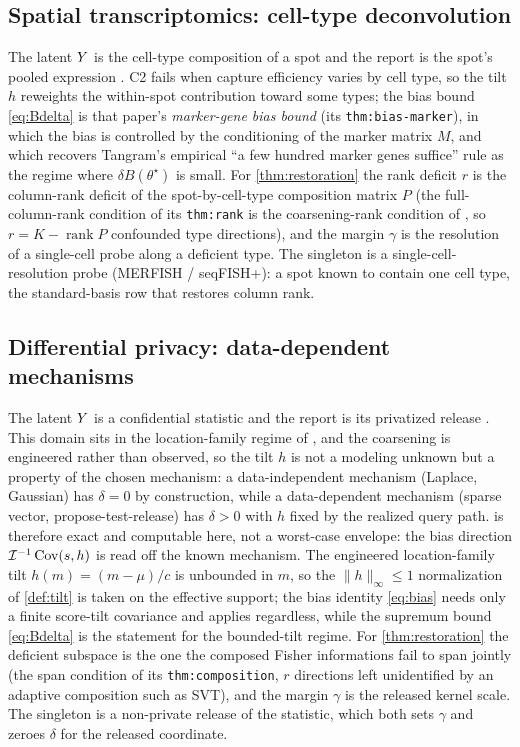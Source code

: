 \subsection{Spatial transcriptomics: cell-type deconvolution}
\label{sec:inst-spatial}

The latent $Y$ is the cell-type composition of a spot and the report is the spot's
pooled expression \citep{towell2026spatialcoarsening}. C2 fails when capture
efficiency varies by cell type, so the tilt $h$ reweights the within-spot
contribution toward some types; the bias bound \eqref{eq:Bdelta} is that paper's
\emph{marker-gene bias bound} (its \texttt{thm:bias-marker}), in which the bias is
controlled by the conditioning of the marker matrix $M$, and which recovers
Tangram's empirical ``a few hundred marker genes suffice'' rule as the regime where
$\delta B(\theta^\star)$ is small. For \cref{thm:restoration} the rank deficit $r$
is the column-rank deficit of the spot-by-cell-type composition matrix $P$ (the
full-column-rank condition of its \texttt{thm:rank} is the coarsening-rank condition
of \citet{towell2026synthesis}, so $r = K - \operatorname{rank} P$ confounded
type directions), and the margin $\gamma$ is the resolution of a single-cell probe
along a deficient type. The singleton is a single-cell-resolution probe
(MERFISH / seqFISH+): a spot known to contain one cell type, the standard-basis row
that restores column rank.

\subsection{Differential privacy: data-dependent mechanisms}
\label{sec:inst-dp}

The latent $Y$ is a confidential statistic and the report is its privatized release
\citep{towell2026dpcoarsening}. This domain sits in the location-family regime of
\citet{towell2026synthesis}, and the coarsening is engineered rather than observed,
so the tilt $h$ is not a modeling unknown but a property of the chosen mechanism: a
data-independent mechanism (Laplace, Gaussian) has $\delta = 0$ by construction,
while a data-dependent mechanism (sparse vector, propose-test-release) has $\delta >
0$ with $h$ fixed by the realized query path.  is therefore
exact and computable here, not a worst-case envelope: the bias direction
$\mathcal{I}^{-1}\operatorname{Cov}(s,h)$ is read off the known mechanism. The engineered location-family
tilt $h(m) = (m - \mu)/c$ is unbounded in $m$, so the $\|h\|_\infty \le 1$
normalization of \cref{def:tilt} is taken on the effective support; the bias identity
\eqref{eq:bias} needs only a finite score-tilt covariance and applies regardless,
while the supremum bound \eqref{eq:Bdelta} is the statement for the bounded-tilt
regime. For \cref{thm:restoration} the
deficient subspace is the one the composed Fisher informations fail to span jointly
(the span condition of its \texttt{thm:composition}, $r$ directions left unidentified
by an adaptive composition such as SVT), and the margin $\gamma$ is the released
kernel scale. The singleton is a non-private release of the statistic, which both
sets $\gamma$ and zeroes $\delta$ for the released coordinate.


